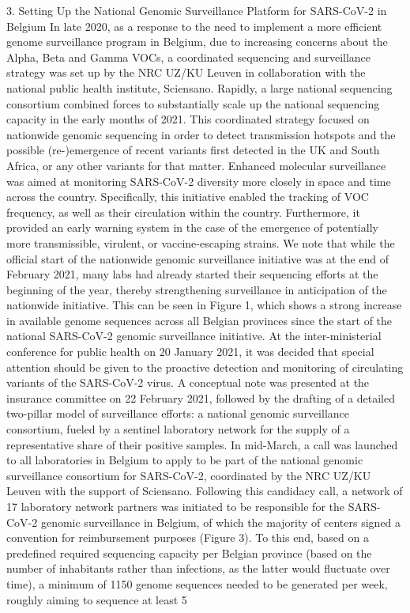 3. Setting Up the National Genomic Surveillance Platform for SARS-CoV-2 in Belgium
In late 2020, as a response to the need to implement a more efficient genome surveillance program in Belgium, due to increasing concerns about the Alpha, Beta and Gamma VOCs, a coordinated sequencing and surveillance strategy was set up by the NRC UZ/KU Leuven in collaboration with the national public health institute, Sciensano. Rapidly, a large national sequencing consortium combined forces to substantially scale up the national sequencing capacity in the early months of 2021. This coordinated strategy focused on nationwide genomic sequencing in order to detect transmission hotspots and the possible (re-)emergence of recent variants first detected in the UK and South Africa, or any other variants for that matter. Enhanced molecular surveillance was aimed at monitoring SARS-CoV-2 diversity more closely in space and time across the country. Specifically, this initiative enabled the tracking of VOC frequency, as well as their circulation within the country. Furthermore, it provided an early warning system in the case of the emergence of potentially more transmissible, virulent, or vaccine-escaping strains. We note that while the official start of the nationwide genomic surveillance initiative was at the end of February 2021, many labs had already started their sequencing efforts at the beginning of the year, thereby strengthening surveillance in anticipation of the nationwide initiative. This can be seen in Figure 1, which shows a strong increase in available genome sequences across all Belgian provinces since the start of the national SARS-CoV-2 genomic surveillance initiative.
At the inter-ministerial conference for public health on 20 January 2021, it was decided that special attention should be given to the proactive detection and monitoring of circulating variants of the SARS-CoV-2 virus. A conceptual note was presented at the insurance committee on 22 February 2021, followed by the drafting of a detailed two-pillar model of surveillance efforts: a national genomic surveillance consortium, fueled by a sentinel laboratory network for the supply of a representative share of their positive samples. In mid-March, a call was launched to all laboratories in Belgium to apply to be part of the national genomic surveillance consortium for SARS-CoV-2, coordinated by the NRC UZ/KU Leuven with the support of Sciensano. Following this candidacy call, a network of 17 laboratory network partners was initiated to be responsible for the SARS-CoV-2 genomic surveillance in Belgium, of which the majority of centers signed a convention for reimbursement purposes (Figure 3). To this end, based on a predefined required sequencing capacity per Belgian province (based on the number of inhabitants rather than infections, as the latter would fluctuate over time), a minimum of 1150 genome sequences needed to be generated per week, roughly aiming to sequence at least 5%
